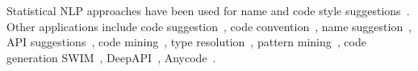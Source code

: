 %
Statistical NLP approaches have been used for name and code style
suggestions~\cite{sutton-fse15,barr-codeconvention-fse14}.
%
%
Other applications 
include code suggestion~\cite{hindle-icse12,tbcnn14}, code
convention~\cite{barr-codeconvention-fse14}, name
suggestion~\cite{sutton-fse15}, API suggestions~\cite{raychev-pldi14},
code mining~\cite{sutton-msr13}, type resolution~\cite{icse18},
pattern mining~\cite{sutton-16}, code generation
\eg SWIM~\cite{Raghothaman-ICSE16},
DeepAPI~\cite{gu-fse16}, Anycode~\cite{anycode-oopsla15}.

